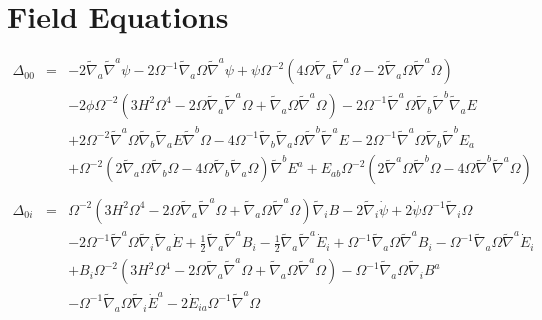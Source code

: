 \documentclass[10pt,letterpaper]{article}
\numberwithin{equation}{section}
\begin{document}
\section{Field Equations}
%
%
\begin{eqnarray}
\Delta_{00}&=& -2 \tilde{\nabla}_{a}\tilde{\nabla}^{a}\psi - 2 \Omega^{-1} \tilde{\nabla}_{a}\Omega \tilde{\nabla}^{a}\psi + \psi \Omega^{-2} (4 \Omega \tilde{\nabla}_{a}\tilde{\nabla}^{a}\Omega - 2 \tilde{\nabla}_{a}\Omega \tilde{\nabla}^{a}\Omega) \nonumber \\ 
&& - 2 \phi \Omega^{-2} (3 H^2 \Omega^4 - 2 \Omega \tilde{\nabla}_{a}\tilde{\nabla}^{a}\Omega + \tilde{\nabla}_{a}\Omega \tilde{\nabla}^{a}\Omega) - 2 \Omega^{-1} \tilde{\nabla}^{a}\Omega \tilde{\nabla}_{b}\tilde{\nabla}^{b}\tilde{\nabla}_{a}E \nonumber \\ 
&& + 2 \Omega^{-2} \tilde{\nabla}^{a}\Omega \tilde{\nabla}_{b}\tilde{\nabla}_{a}E \tilde{\nabla}^{b}\Omega - 4 \Omega^{-1} \tilde{\nabla}_{b}\tilde{\nabla}_{a}\Omega \tilde{\nabla}^{b}\tilde{\nabla}^{a}E-2 \Omega^{-1} \tilde{\nabla}^{a}\Omega \tilde{\nabla}_{b}\tilde{\nabla}^{b}E_{a} \nonumber \\ 
&& + \Omega^{-2} (2 \tilde{\nabla}_{a}\Omega \tilde{\nabla}_{b}\Omega - 4 \Omega \tilde{\nabla}_{b}\tilde{\nabla}_{a}\Omega) \tilde{\nabla}^{b}E^{a}+E_{ab} \Omega^{-2} (2 \tilde{\nabla}^{a}\Omega \tilde{\nabla}^{b}\Omega - 4 \Omega \tilde{\nabla}^{b}\tilde{\nabla}^{a}\Omega)
\\  \nonumber\\ 
\Delta_{0i}&=& \Omega^{-2} (3 H^2 \Omega^4 - 2 \Omega \tilde{\nabla}_{a}\tilde{\nabla}^{a}\Omega + \tilde{\nabla}_{a}\Omega \tilde{\nabla}^{a}\Omega) \tilde{\nabla}_{i}B - 2 \tilde{\nabla}_{i}\dot{\psi} + 2 \dot{\psi} \Omega^{-1} \tilde{\nabla}_{i}\Omega \nonumber \\ 
&& - 2 \Omega^{-1} \tilde{\nabla}^{a}\Omega \tilde{\nabla}_{i}\tilde{\nabla}_{a}\dot{E}+\tfrac{1}{2} \tilde{\nabla}_{a}\tilde{\nabla}^{a}B_{i} -  \tfrac{1}{2} \tilde{\nabla}_{a}\tilde{\nabla}^{a}\dot{E}_{i} + \Omega^{-1} \tilde{\nabla}_{a}\Omega \tilde{\nabla}^{a}B_{i} -  \Omega^{-1} \tilde{\nabla}_{a}\Omega \tilde{\nabla}^{a}\dot{E}_{i} \nonumber \\ 
&& + B_{i} \Omega^{-2} (3 H^2 \Omega^4 - 2 \Omega \tilde{\nabla}_{a}\tilde{\nabla}^{a}\Omega + \tilde{\nabla}_{a}\Omega \tilde{\nabla}^{a}\Omega) -  \Omega^{-1} \tilde{\nabla}_{a}\Omega \tilde{\nabla}_{i}B^{a} \nonumber \\ 
&& -  \Omega^{-1} \tilde{\nabla}_{a}\Omega \tilde{\nabla}_{i}\dot{E}^{a}-2 \dot{E}_{ia} \Omega^{-1} \tilde{\nabla}^{a}\Omega 

\end{eqnarray}
\end{document}
